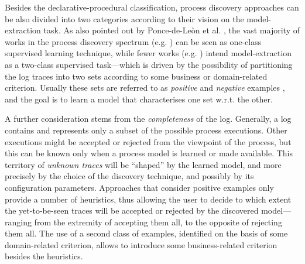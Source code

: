 \documentclass[a4wide,11pt]{article}
\theoremstyle{definition}
\theoremstyle{plain}
\begin{document}
Besides the declarative-procedural classification, process discovery approaches can be also divided into two categories according to their vision on the model-extraction task. 
As also pointed out by Ponce-de-Le\`on et al. \cite{2018-Ponce}, the vast majority of works in the process discovery spectrum (e.g. \cite{2004-Aalst,2003-Weijters,2007-Gunther,2010-Aalst}) can be seen as one-class supervised learning technique, while fewer works (e.g. \cite{2006-Maruster,2009-Goedertier,2009-Chesani}) intend model-extraction as a two-class supervised task---which is driven by the possibility of partitioning the log traces into two sets according to some business or domain-related criterion. Usually these sets are referred to as \emph{positive} and \emph{negative} examples \cite{2018-Ponce}, and the goal is to learn a model that characterises one set w.r.t. the other.

A further consideration stems from the \emph{completeness} of the log. Generally, a log contains and represents only a subset of the possible process executions. Other executions might be accepted or rejected from the viewpoint of the process, but this can be known only when a process model is learned or made available. This territory of \emph{unknown traces} will be ``shaped'' by the learned model, and more precisely by the choice of the discovery technique, and possibly by its configuration parameters. Approaches that consider positive examples only provide a number of heuristics, thus allowing the user to decide to which extent the yet-to-be-seen traces will be accepted or rejected by the discovered model---ranging from the extremity of accepting them all, to the opposite of rejecting them all.
The use of a second class of examples, identified on the basis of some domain-related criterion, allows to introduce some business-related criterion besides the heuristics.
\end{document}
